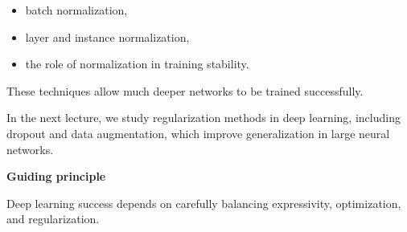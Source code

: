 \begin{itemize}
\item batch normalization,
\item layer and instance normalization,
\item the role of normalization in training stability.
\end{itemize}

\medskip

These techniques allow much deeper networks to be trained successfully.

\medskip

In the next lecture, we study regularization methods in deep learning, including dropout and data augmentation, which improve generalization in large neural networks.

\medskip

\textbf{Guiding principle}

Deep learning success depends on carefully balancing expressivity, optimization, and regularization.